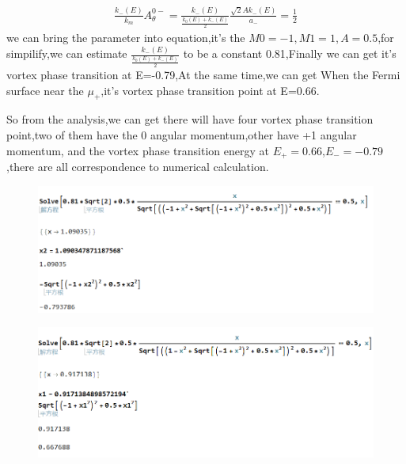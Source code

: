 \documentclass[4pt]{article}
\begin{document}
\begin{align}
	\frac{k_{-}(E)}{k_m}A_{\theta}^{0-}=\frac{k_{-}(E)}{\frac{k_{0}(E)+k_{-}(E)}{2}}\frac{\sqrt{2}Ak_{-}(E)}{a_{-}}=\frac{1}{2}
\end{align}
we can bring the parameter into equation,it's the $M0=-1,M1=1,A=0.5$,for simpilify,we can estimate $\frac{k_{-}(E)}{\frac{k_{0}(E)+k_{-}(E)}{2}}$ to be a constant 0.81,Finally we can get it's vortex phase transition at E=-0.79,At the same time,we can get When the Fermi surface near the $\mu_{+}$,it's vortex phase transition point at E=0.66.
\par 
So from the analysis,we can get there will have four vortex phase transition point,two of them have the 0 angular momentum,other have +1 angular momentum, and the vortex phase transition energy at $E_{+}=0.66$,$E_{-}=-0.79$,there are all correspondence to numerical calculation.

\par 

\begin{figure}[H]
	\centering
	\includegraphics[scale=0.6]{figure/3}
\end{figure}
\begin{figure}[H]
	\centering
	\includegraphics[scale=0.6]{figure/4}
\end{figure}
\end{document}
